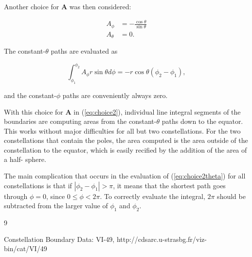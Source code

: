 \documentclass[11pt]{article}
\newcommand{\bvec}[1]{\bm{#1}}
\begin{document}
Another choice for $\bvec{A}$ was then considered:

\begin{equation}
\begin{split}
	A_\phi &= - \frac{\cos\theta}{\sin\theta} \\
	A_\theta &= 0.
	\label{eq:choice2}
\end{split}
\end{equation}

The constant-$\theta$ paths are evaluated as

\begin{equation}
	\int_{\phi_1}^{\phi_2} A_\phi r \sin\theta d\phi = -r \cos\theta \left( \phi_2 - \phi_1 \right),
	\label{eq:choice2theta}
\end{equation}

and the constant-$\phi$ paths are conveniently always zero.

With this choice for $\bvec{A}$ in (\ref{eq:choice2}), individual line integral segments of the boundaries are computing
areas from the constant-$\theta$ paths down to the equator.  This works without major difficulties for all but two
constellations.  For the two constellations that contain the poles, the area computed
is the area outside of the constellation to the equator, which is easily recified by the addition of the area of a half-
sphere.

The main complication that occurs in the evaluation of (\ref{eq:choice2theta}) for all constellations is that if $|\phi_2 - \phi_1| > \pi$,
it means that the shortest path goes through $\phi=0$, since $0 \le \phi < 2\pi$.  To correctly evaluate the integral,
$2\pi$ should be subtracted from the larger value of $\phi_1$ and $\phi_2$.

\begin{thebibliography}{9}

Constellation Boundary Data: VI-49, http://cdsarc.u-strasbg.fr/viz-bin/cat/VI/49

\end{thebibliography}
\end{document}
